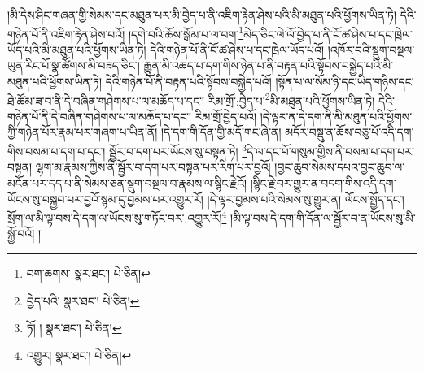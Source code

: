 །མི་དེས་ཤིང་གཞན་གྱི་སེམས་དང་མཐུན་པར་མི་བྱེད་པ་ནི་འཇིག་རྟེན་ཤེས་པའི་མི་མཐུན་པའི་ཕྱོགས་ཡིན་ཏེ། དེའི་གཉེན་པོ་ནི་འཇིག་རྟེན་ཤེས་པའོ། །དགེ་བའི་ཆོས་སྒོམ་པ་ལ་བག་\footnote{བག་ཆགས་  སྣར་ཐང་།  པེ་ཅིན། }མེད་ཅིང་ལེ་ལོ་བྱེད་པ་ནི་ངོ་ཚ་ཤེས་པ་དང་ཁྲེལ་ཡོད་པའི་མི་མཐུན་པའི་ཕྱོགས་ཡིན་ཏེ། དེའི་གཉེན་པོ་ནི་ངོ་ཚ་ཤེས་པ་དང་ཁྲེལ་ཡོད་པའོ། །འཁོར་བའི་སྡུག་བསྔལ་ཡུན་རིང་པོ་སྣ་ཚོགས་མི་བཟད་ཅིང་། རྒྱུན་མི་འཆད་པ་དག་གིས་ཉེན་པ་ནི་བརྟན་པའི་སྟོབས་བསྐྱེད་པའི་མི་མཐུན་པའི་ཕྱོགས་ཡིན་ཏེ། དེའི་གཉེན་པོ་ནི་བརྟན་པའི་སྟོབས་བསྐྱེད་པའོ། །སྟོན་པ་ལ་སོམ་ཉི་དང་ཡིད་གཉིས་དང་ཐེ་ཚོམ་ཟ་བ་ནི་དེ་བཞིན་གཤེགས་པ་ལ་མཆོད་པ་དང་། རིམ་གྲོ་:བྱེད་པ་\footnote{བྱེད་པའི་  སྣར་ཐང་།  པེ་ཅིན། }མི་མཐུན་པའི་ཕྱོགས་ཡིན་ཏེ། དེའི་གཉེན་པོ་ནི་དེ་བཞིན་གཤེགས་པ་ལ་མཆོད་པ་དང་། རིམ་གྲོ་བྱེད་པའོ། །དེ་ལྟར་ན་དེ་དག་ནི་མི་མཐུན་པའི་ཕྱོགས་ཀྱི་གཉེན་པོར་རྣམ་པར་གཞག་པ་ཡིན་ནོ། །དེ་དག་གི་དོན་གྱི་མདོ་གང་ཞེ་ན། མདོར་བསྡུ་ན་ཆོས་བཅུ་པོ་འདི་དག་གིས་བསམ་པ་དག་པ་དང་། སྦྱོར་བ་དག་པར་ཡོངས་སུ་བསྟན་ཏེ། \footnote{ཏོ། །   སྣར་ཐང་།  པེ་ཅིན། }དེ་ལ་དང་པོ་གསུམ་གྱིས་ནི་བསམ་པ་དག་པར་བསྟན། ལྷག་མ་རྣམས་ཀྱིས་ནི་སྦྱོར་བ་དག་པར་བསྟན་པར་རིག་པར་བྱའོ། །བྱང་ཆུབ་སེམས་དཔའ་བྱང་ཆུབ་ལ་མངོན་པར་དད་པ་ནི་སེམས་ཅན་སྡུག་བསྔལ་བ་རྣམས་ལ་སྙིང་རྗེའོ། །སྙིང་རྗེ་བར་གྱུར་ན་བདག་གིས་འདི་དག་ཡོངས་སུ་བསྐྱབ་པར་བྱའོ་སྙམ་དུ་བྱམས་པར་འགྱུར་རོ། །དེ་ལྟར་བྱམས་པའི་སེམས་སུ་གྱུར་ན། ལོངས་སྤྱོད་དང་། སྲོག་ལ་མི་ལྟ་བས་དེ་དག་ལ་ཡོངས་སུ་གཏོང་བར་:འགྱུར་རོ།\footnote{འགྱུར།  སྣར་ཐང་།  པེ་ཅིན། } །མི་ལྟ་བས་དེ་དག་གི་དོན་ལ་སྦྱོར་བ་ན་ཡོངས་སུ་མི་སྐྱོ་བའོ། །
